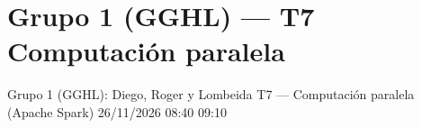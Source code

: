 
\section{Grupo 1 (GGHL) --- T7 Computación paralela}

\identificacion
{Grupo 1 (GGHL): Diego, Roger y Lombeida}
{T7 --- Computación paralela (Apache Spark)}
{26/11/2026}
{08:40}
{09:10}

